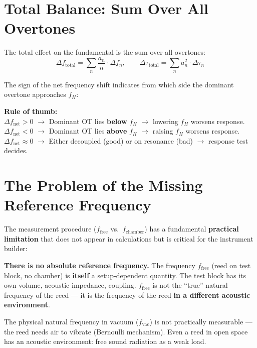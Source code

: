 \documentclass[11pt,a4paper]{article}
\begin{document}
\section{Total Balance: Sum Over All Overtones}

The total effect on the fundamental is the sum over all overtones:
\begin{equation}
\Delta f_\text{total} = \sum_n \frac{a_n}{n} \cdot \Delta f_n, \qquad
\Delta\tau_\text{total} = \sum_n a_n^2 \cdot \Delta\tau_n
\end{equation}

The sign of the net frequency shift indicates from which side the dominant overtone approaches $f_H$:

\begin{keybox}
\textbf{Rule of thumb:}\\
$\Delta f_\text{net} > 0$ $\to$ Dominant OT lies \textbf{below} $f_H$ $\to$ lowering $f_H$ worsens response.\\
$\Delta f_\text{net} < 0$ $\to$ Dominant OT lies \textbf{above} $f_H$ $\to$ raising $f_H$ worsens response.\\
$\Delta f_\text{net} \approx 0$ $\to$ Either decoupled (good) or on resonance (bad) $\to$ response test decides.
\end{keybox}

\section{The Problem of the Missing Reference Frequency}

The measurement procedure ($f_\text{free}$ vs.\ $f_\text{chamber}$) has a fundamental \textbf{practical limitation} that does not appear in calculations but is critical for the instrument builder:

\begin{warnbox}
\textbf{There is no absolute reference frequency.} The frequency $f_\text{free}$ (reed on test block, no chamber) is \textbf{itself} a setup-dependent quantity. The test block has its own volume, acoustic impedance, coupling. $f_\text{free}$ is not the ``true'' natural frequency of the reed --- it is the frequency of the reed \textbf{in a different acoustic environment}.
\end{warnbox}

The physical natural frequency in vacuum ($f_\text{vac}$) is not practically measurable --- the reed needs air to vibrate (Bernoulli mechanism). Even a reed in open space has an acoustic environment: free sound radiation as a weak load.
\end{document}
